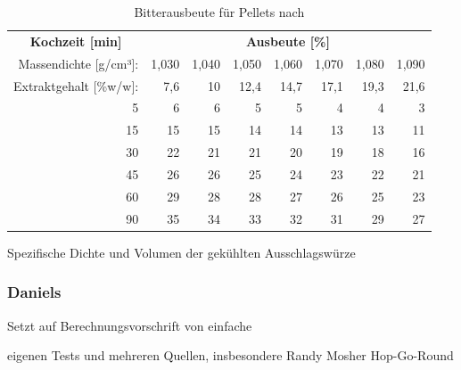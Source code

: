 \documentclass[a4paper,parskip=half]{scrartcl}
\begin{document}
\begin{table}[H]
\centering
\begin{tabular}{rrrrrrrr} 
\toprule
\multicolumn{1}{c}{\textbf{Kochzeit [min]}} & \multicolumn{7}{c}{\textbf{Ausbeute [\%]}}  \\
Massendichte [g/cm³]:                                        & 1,030 & 1,040 & 1,050 & 1,060 & 1,070 & 1,080  & 1,090                   \\
Extraktgehalt [\%w/w]:                                            & 7,6 & 10 & 12,4 & 14,7 & 17,1 & 19,3  & 21,6                   \\  
\midrule
5                                            & 6     & 6     & 5     & 5     & 4     & 4      & 3                          \\
15                                           & 15    & 15    & 14    & 14    & 13    & 13     & 11                         \\
30                                           & 22    & 21    & 21    & 20    & 19    & 18     & 16                         \\
45                                           & 26    & 26    & 25    & 24    & 23    & 22     & 21                         \\
60                                           & 29    & 28    & 28    & 27    & 26    & 25     & 23                         \\
90                                           & 35    & 34    & 33    & 32    & 31    & 29     & 27                         \\
\bottomrule
\end{tabular}
\caption{Bitterausbeute für Pellets nach \citeauthor{Mosher1994} \parencite[51]{Holle2010}}
\label{table:mosherutilpellets}
\end{table}

\parencite[53]{Holle2010}
Spezifische Dichte und Volumen der gekühlten Ausschlagswürze


                              

\subsubsection*{Daniels}

\parencite[80]{Daniels1996}
Setzt auf Berechnungsvorschrift von \citeauthor{Rager1990}
einfache

eigenen Tests und mehreren Quellen, insbesondere Randy Mosher
Hop-Go-Round
\end{document}
